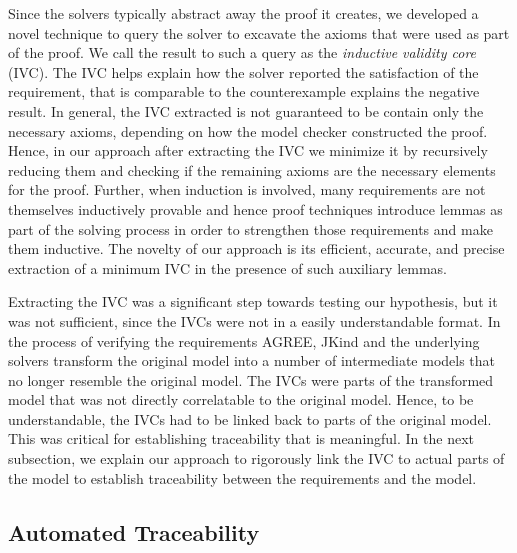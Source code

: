 Since the solvers typically abstract away the proof it creates, we developed a novel technique to query the solver to excavate the axioms that were used as part of the proof. We call the result to such a query as the {\em inductive validity core} (IVC). The IVC helps explain how the solver reported the satisfaction of the requirement, that is comparable to the counterexample explains the negative result. In general, the IVC extracted is not guaranteed to be contain only the necessary axioms, depending on how the model checker constructed the proof. Hence, in our approach after
extracting the IVC we minimize it by recursively reducing them and checking if the remaining axioms are
the necessary elements for the proof. Further, when induction is involved, many requirements are not
themselves inductively provable and hence proof techniques introduce lemmas as part of the solving
process in order to strengthen those requirements and make them inductive. The novelty of our approach
is its efficient, accurate, and precise extraction of a minimum IVC in the presence of such auxiliary
lemmas.

Extracting the IVC was a significant step towards testing our hypothesis, but it was not sufficient, since the IVCs were not in a easily understandable format. In the process of verifying the requirements AGREE, JKind and the underlying solvers transform the original model into a number of intermediate models that no longer resemble the original model. The IVCs were parts of the transformed model that was not directly correlatable to the original model. Hence, to be understandable, the IVCs had to be linked back to parts of the original model. This was critical for establishing traceability that is meaningful. In the next subsection, we explain our approach to rigorously link the IVC to actual parts of the model to establish traceability between the requirements and the model.

\subsection{Automated Traceability}

